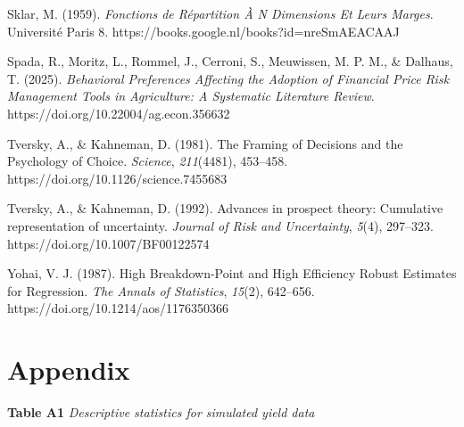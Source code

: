 \documentclass[
]{article}
\begin{document}
Sklar, M. (1959). \emph{Fonctions de Répartition À N Dimensions Et Leurs
Marges}. Université Paris 8.
https://books.google.nl/books?id=nreSmAEACAAJ

Spada, R., Moritz, L., Rommel, J., Cerroni, S., Meuwissen, M. P. M., \&
Dalhaus, T. (2025). \emph{Behavioral Preferences Affecting the Adoption
of Financial Price Risk Management Tools in Agriculture: A Systematic
Literature Review}. https://doi.org/10.22004/ag.econ.356632

Tversky, A., \& Kahneman, D. (1981). The Framing of Decisions and the
Psychology of Choice. \emph{Science}, \emph{211}(4481), 453--458.
https://doi.org/10.1126/science.7455683

Tversky, A., \& Kahneman, D. (1992). Advances in prospect theory:
Cumulative representation of uncertainty. \emph{Journal of Risk and
Uncertainty}, \emph{5}(4), 297--323. https://doi.org/10.1007/BF00122574

Yohai, V. J. (1987). High Breakdown-Point and High Efficiency Robust
Estimates for Regression. \emph{The Annals of Statistics}, \emph{15}(2),
642--656. https://doi.org/10.1214/aos/1176350366

\section{Appendix}\label{appendix}

\textbf{Table A1} \emph{Descriptive statistics for simulated yield data}
\end{document}
